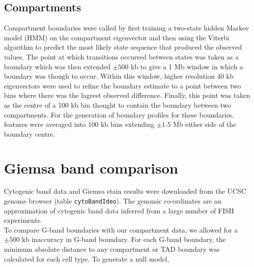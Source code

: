 \documentclass[a4paper]{report}
\begin{document}
\subsection{Compartments}\label{sec:compartments}
Compartment boundaries were called by first training a two-state
hidden Markov model (HMM) on the compartment eigenvector and then
using the Viterbi algorithm to predict the most likely state sequence
that produced the observed values. The point at which transitions
occurred between states was taken as a boundary which was then
extended $\pm500$ kb to give a 1 Mb window in which a boundary was
though to occur. Within this window, higher resolution $40$ kb
eigenvectors were used to refine the boundary estimate to a point
between two bins where there was the lagrest observed
difference. Finally, this point was taken as the centre of a 100 kb
bin thought to contain the boundary between two compartments. For the
generation of boundary profiles for these boundaries, features were
averaged into 100 kb bins extending $\pm1.5$ Mb either side of the
boundary centre.

\section{Giemsa band comparison}
Cytogenic band data and Giemsa stain results were downloaded from the UCSC genome browser (table
{{\tt cytoBandIdeo}}). The genomic co-ordinates are an approximation of
cytogenic band data inferred from a large number of FISH
experiments.\cite{Furey2003} \\

To compare G-band boundaries with our compartment data, we allowed for
a $\pm 500$ kb inaccuracy in G-band boundary. For each G-band
boundary, the minimum absolute distance to any compartment or TAD
boundary was calculated for each cell type. To generate a null model, 



%

\begin{small}

\end{small}
\end{document}
